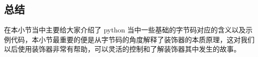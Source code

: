 \subsection{总结}
在本小节当中主要给大家介绍了 python 当中一些基础的字节码对应的含义以及示例代码，本小节最重要的便是从字节码的角度解释了装饰器的本质原理，这对我们以后使用装饰器非常有帮助，可以灵活的控制和了解装饰器其中发生的故事。
